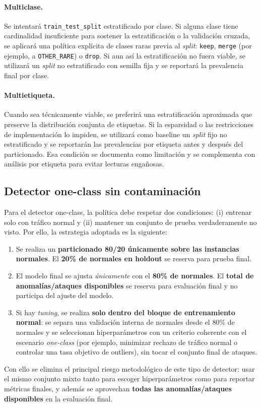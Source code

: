 \documentclass[12pt,oneside]{report}
\begin{document}
\paragraph{Multiclase.}
Se intentará \texttt{train\_test\_split} estratificado por clase. Si alguna clase tiene cardinalidad insuficiente para sostener la estratificación o la validación cruzada, se aplicará una política explícita de clases raras previa al \textit{split}: \texttt{keep}, \texttt{merge} (por ejemplo, a \texttt{OTHER\_RARE}) o \texttt{drop}. Si aun así la estratificación no fuera viable, se utilizará un \textit{split} no estratificado con semilla fija y se reportará la prevalencia final por clase.

\paragraph{Multietiqueta.}
Cuando sea técnicamente viable, se preferirá una estratificación aproximada que preserve la distribución conjunta de etiquetas. Si la esparsidad o las restricciones de implementación lo impiden, se utilizará como baseline un \textit{split} fijo no estratificado y se reportarán las prevalencias por etiqueta antes y después del particionado. Esa condición se documenta como limitación y se complementa con análisis por etiqueta para evitar lecturas engañosas.

\subsection{Detector one-class sin contaminación}
Para el detector one-class, la política debe respetar dos condiciones: (i) entrenar solo con tráfico normal y (ii) mantener un conjunto de prueba verdaderamente no visto. Por ello, la estrategia adoptada es la siguiente:
\begin{enumerate}[leftmargin=*]
  \item Se realiza un \textbf{particionado 80/20 únicamente sobre las instancias normales}. El \textbf{20\% de normales en holdout} se reserva para prueba final.
  \item El modelo final se ajusta \emph{únicamente} con el \textbf{80\% de normales}. El \textbf{total de anomalías/ataques disponibles} se reserva para evaluación final y no participa del ajuste del modelo.
  \item Si hay \textit{tuning}, se realiza \textbf{solo dentro del bloque de entrenamiento normal}: se separa una validación interna de normales desde el 80\% de normales y se seleccionan hiperparámetros con un criterio coherente con el escenario \textit{one-class} (por ejemplo, minimizar rechazo de tráfico normal o controlar una tasa objetivo de outliers), sin tocar el conjunto final de ataques.
\end{enumerate}
Con ello se elimina el principal riesgo metodológico de este tipo de detector: usar el mismo conjunto mixto tanto para escoger hiperparámetros como para reportar métricas finales, y además se aprovechan \textbf{todas las anomalías/ataques disponibles} en la evaluación final.
\end{document}
